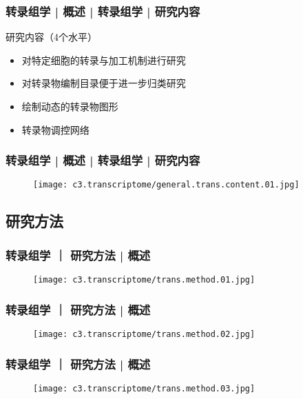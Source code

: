 \begin{frame}
  \frametitle{转录组学 | 概述 | 转录组学 | 研究内容}
  \begin{block}{研究内容（4个水平）}
    \begin{itemize}
      \item 对特定细胞的转录与加工机制进行研究
      \item 对转录物编制目录便于进一步归类研究
      \item 绘制动态的转录物图形
      \item 转录物调控网络
    \end{itemize}
  \end{block}
\end{frame}

\begin{frame}
  \frametitle{转录组学 | 概述 | 转录组学 | 研究内容}
  \begin{figure}
    \centering
    \texttt{[image: c3.transcriptome/general.trans.content.01.jpg]}
  \end{figure}
\end{frame}

\subsection{研究方法}
\begin{frame}
  \frametitle{转录组学 ｜ 研究方法 | 概述}
  \begin{figure}
    \centering
    \texttt{[image: c3.transcriptome/trans.method.01.jpg]}
  \end{figure}
\end{frame}

\begin{frame}
  \frametitle{转录组学 ｜ 研究方法 | 概述}
  \begin{figure}
    \centering
    \texttt{[image: c3.transcriptome/trans.method.02.jpg]}
  \end{figure}
\end{frame}

\begin{frame}
  \frametitle{转录组学 ｜ 研究方法 | 概述}
  \begin{figure}
    \centering
    \texttt{[image: c3.transcriptome/trans.method.03.jpg]}
  \end{figure}
\end{frame}


